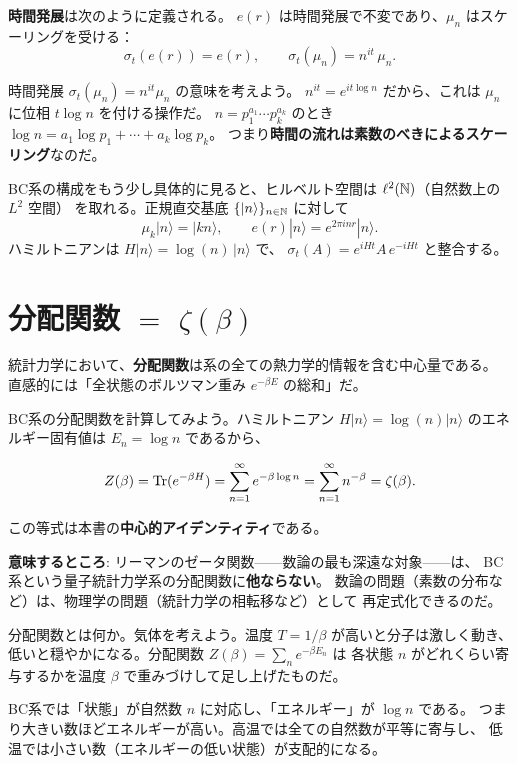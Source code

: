 \noindent\textbf{時間発展}は次のように定義される。
$e(r)$ は時間発展で不変であり、$\mu_n$ はスケーリングを受ける：
\[
  \sigma_t(e(r)) = e(r), \qquad
  \sigma_t(\mu_n) = n^{it}\, \mu_n.
\]

\begin{hsbox}
時間発展 $\sigma_t(\mu_n) = n^{it}\mu_n$ の意味を考えよう。
$n^{it} = e^{it\log n}$ だから、これは $\mu_n$ に位相 $t\log n$ を付ける操作だ。
$n = p_1^{a_1}\cdots p_k^{a_k}$ のとき $\log n = a_1 \log p_1 + \cdots + a_k \log p_k$。
つまり\textbf{時間の流れは素数のべきによるスケーリング}なのだ。
\end{hsbox}

BC系の構成をもう少し具体的に見ると、ヒルベルト空間は $\ell^2(\mathbb{N})$（自然数上の $L^2$ 空間）
を取れる。正規直交基底 $\{|n\rangle\}_{n\in\mathbb{N}}$ に対して
\[
  \mu_k |n\rangle = |kn\rangle, \qquad
  e(r) |n\rangle = e^{2\pi i n r} |n\rangle.
\]
ハミルトニアンは $H|n\rangle = \log(n)\,|n\rangle$ で、
$\sigma_t(A) = e^{iHt}A\,e^{-iHt}$ と整合する。

\section{分配関数 $=$ $\zeta(\beta)$}
\label{sec:2.3}

統計力学において、\textbf{分配関数}は系の全ての熱力学的情報を含む中心量である。
直感的には「全状態のボルツマン重み $e^{-\beta E}$ の総和」だ。

BC系の分配関数を計算してみよう。ハミルトニアン $H|n\rangle = \log(n)|n\rangle$
のエネルギー固有値は $E_n = \log n$ であるから、

\begin{keybox}[BC系の分配関数 $=$ ゼータ関数]
\[
  Z(\beta) = \operatorname{Tr}(e^{-\beta H})
           = \sum_{n=1}^{\infty} e^{-\beta \log n}
           = \sum_{n=1}^{\infty} n^{-\beta}
           = \zeta(\beta).
\]
\end{keybox}

\noindent この等式は本書の\textbf{中心的アイデンティティ}である。

\textbf{意味するところ}: リーマンのゼータ関数——数論の最も深遠な対象——は、
BC系という量子統計力学系の分配関数に\textbf{他ならない}。
数論の問題（素数の分布など）は、物理学の問題（統計力学の相転移など）として
再定式化できるのだ。

\begin{hsbox}
分配関数とは何か。気体を考えよう。温度 $T = 1/\beta$ が高いと分子は激しく動き、
低いと穏やかになる。分配関数 $Z(\beta) = \sum_n e^{-\beta E_n}$ は
各状態 $n$ がどれくらい寄与するかを温度 $\beta$ で重みづけして足し上げたものだ。

BC系では「状態」が自然数 $n$ に対応し、「エネルギー」が $\log n$ である。
つまり大きい数ほどエネルギーが高い。高温では全ての自然数が平等に寄与し、
低温では小さい数（エネルギーの低い状態）が支配的になる。
\end{hsbox}

